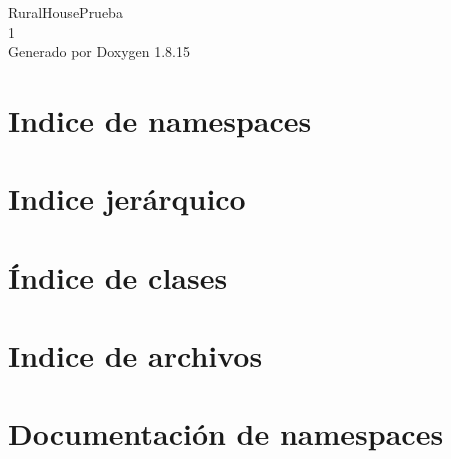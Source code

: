 \let\mypdfximage\pdfximage\def\pdfximage{\immediate\mypdfximage}\documentclass[twoside]{book}
\newcommand{\+}{\discretionary{\mbox{\scriptsize$\hookleftarrow$}}{}{}}
\newcommand{\clearemptydoublepage}{%
  \newpage{\pagestyle{empty}\cleardoublepage}%
}
\begin{document}
\hypersetup{pageanchor=false,
             bookmarksnumbered=true,
             pdfencoding=unicode
            }
\begin{titlepage}
\vspace*{7cm}
\begin{center}%
{\Large Rural\+House\+Prueba \\[1ex]\large 1 }\\
\vspace*{1cm}
{\large Generado por Doxygen 1.8.15}\\
\end{center}
\end{titlepage}
\clearemptydoublepage
{}
\tableofcontents
\clearemptydoublepage
{}
\hypersetup{pageanchor=true}

\chapter{Indice de namespaces}

\chapter{Indice jerárquico}

\chapter{Índice de clases}

\chapter{Indice de archivos}

\chapter{Documentación de namespaces}









\end{document}
